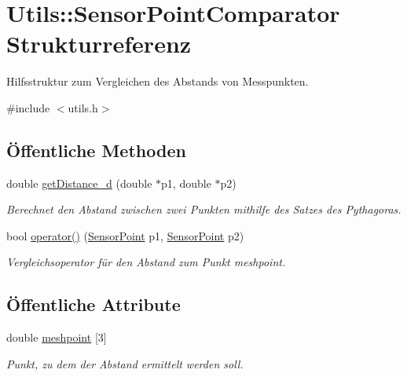 \hypertarget{structUtils_1_1SensorPointComparator}{\section{Utils\-:\-:Sensor\-Point\-Comparator Strukturreferenz}
\label{structUtils_1_1SensorPointComparator}
}


Hilfsstruktur zum Vergleichen des Abstands von Messpunkten.  




{\ttfamily \#include $<$utils.\-h$>$}

\subsection*{Öffentliche Methoden}
\begin{DoxyCompactItemize}
\item 
double \hyperlink{structUtils_1_1SensorPointComparator_a2b31195024a7ec123551b2bb87043a68}{get\-Distance\-\_\-d} (double $\ast$p1, double $\ast$p2)
\begin{DoxyCompactList}\small\item\em Berechnet den Abstand zwischen zwei Punkten mithilfe des Satzes des Pythagoras. \end{DoxyCompactList}\item 
bool \hyperlink{structUtils_1_1SensorPointComparator_a92795eac49f9ea851c04a623c5a3d6b6}{operator()} (\hyperlink{structUtils_1_1SensorPoint}{Sensor\-Point} p1, \hyperlink{structUtils_1_1SensorPoint}{Sensor\-Point} p2)
\begin{DoxyCompactList}\small\item\em Vergleichsoperator für den Abstand zum Punkt meshpoint. \end{DoxyCompactList}\end{DoxyCompactItemize}
\subsection*{Öffentliche Attribute}
\begin{DoxyCompactItemize}
\item 
double \hyperlink{structUtils_1_1SensorPointComparator_a51335aca914559e34d9202b67d90b143}{meshpoint} \mbox{[}3\mbox{]}
\begin{DoxyCompactList}\small\item\em Punkt, zu dem der Abstand ermittelt werden soll. \end{DoxyCompactList}\end{DoxyCompactItemize}



